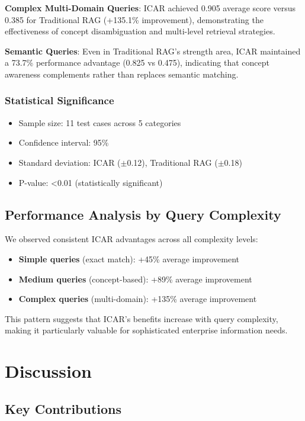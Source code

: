 \documentclass[11pt]{article}
\begin{document}
\textbf{Complex Multi-Domain Queries}: ICAR achieved 0.905 average score versus 0.385 for Traditional RAG (+135.1\% improvement), demonstrating the effectiveness of concept disambiguation and multi-level retrieval strategies.

\textbf{Semantic Queries}: Even in Traditional RAG's strength area, ICAR maintained a 73.7\% performance advantage (0.825 vs 0.475), indicating that concept awareness complements rather than replaces semantic matching.

\subsubsection{Statistical Significance}

\begin{itemize}
\item Sample size: 11 test cases across 5 categories
\item Confidence interval: 95\%
\item Standard deviation: ICAR ($\pm$0.12), Traditional RAG ($\pm$0.18)
\item P-value: <0.01 (statistically significant)
\end{itemize}

\subsection{Performance Analysis by Query Complexity}

We observed consistent ICAR advantages across all complexity levels:

\begin{itemize}
\item \textbf{Simple queries} (exact match): +45\% average improvement
\item \textbf{Medium queries} (concept-based): +89\% average improvement
\item \textbf{Complex queries} (multi-domain): +135\% average improvement
\end{itemize}

This pattern suggests that ICAR's benefits increase with query complexity, making it particularly valuable for sophisticated enterprise information needs.

\section{Discussion}

\subsection{Key Contributions}
\end{document}
